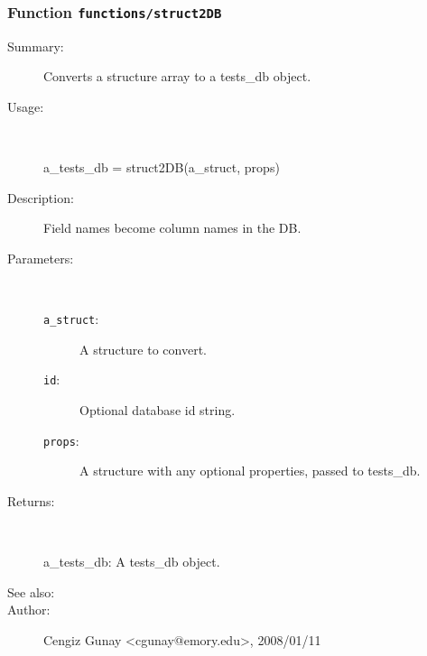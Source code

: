 \subsubsection[Function \texttt{struct2DB}]{Function \texttt{functions/struct2DB}}%
%
\label{ref_functions__struct2DB}%
\hypertarget{ref_functions__struct2DB}{}%
\begin{description}
\item[Summary:]Converts a structure array to a tests\_db object.
%
\item[Usage:]~%
\begin{lyxcode}%
a\_tests\_db = struct2DB(a\_struct, props)
%
\end{lyxcode}%
%
\item[Description:]%
Field names become column names in the DB.
\item[Parameters:]~
\begin{description}%
\item[\texttt{a\_struct}:]
 A structure to convert.
\item[\texttt{id}:]
 Optional database id string.
\item[\texttt{props}:]
 A structure with any optional properties, passed to tests\_db.
\end{description}%
%
\item[Returns:
]~

	a\_tests\_db: A tests\_db object.
%
%
\item[See also:]%
%
\item[Author:]%
Cengiz Gunay <cgunay@emory.edu>, 2008/01/11
%
\end{description}
\methodline%
